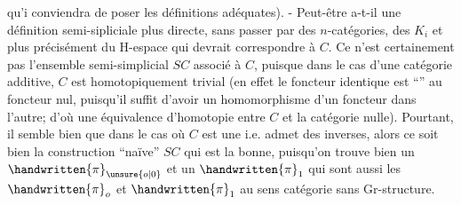 
qu'i conviendra de poser les définitions adéquates). - Peut-être  a-t-il une définition semi-sipliciale plus directe, sans passer par des $n$-catégories, des $K_i$ et plus précisément du H-espace qui devrait correspondre à $C$.
 Ce n'est certainement  pas l'ensemble semi-simplicial $SC$  associé à $C$, puisque dans le cas d'une catégorie additive, $C$ est homotopiquement trivial (en effet le foncteur identique est ``'' au foncteur nul, puisqu'il suffit d'avoir un homomorphisme d'un foncteur dans l'autre; d'où une équivalence d'homotopie entre $C$ et la catégorie nulle). Pourtant, il semble bien que dans le cas où $C$ est une  i.e. admet des inverses, alors ce soit bien la construction ``naïve'' $SC$ qui est la bonne, puisqu'on trouve bien un $\handwritten{\pi}_{\unsure{o|0}}$ et un $\handwritten{\pi}_1$ qui sont aussi les $\handwritten{\pi}_o$ et $\handwritten{\pi}_1$ au sens catégorie sans Gr-structure.


